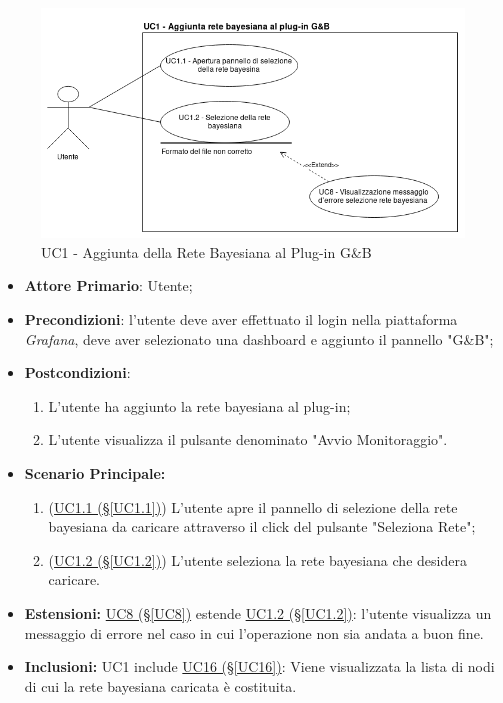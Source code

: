 \begin{figure}[H]
	\begin{center}
		\includegraphics[scale=0.5]{./images/UC1.png}
		 \caption{UC1 - Aggiunta della Rete Bayesiana al Plug-in G\&B}	
	\end{center}
\end{figure}

\begin{itemize}
	\item \textbf{Attore Primario}: Utente;
	\item \textbf{Precondizioni}: l'utente deve aver effettuato il login nella piattaforma \textit{Grafana}, deve aver selezionato una dashboard e aggiunto il pannello "G\&B";
	\item \textbf{Postcondizioni}: 
	\begin{enumerate}
		\item L'utente ha aggiunto la rete bayesiana al plug-in;
		\item L'utente visualizza il pulsante denominato "Avvio Monitoraggio".
	\end{enumerate}
	\item \textbf{Scenario Principale:}
	\begin{enumerate}
		\item (\hyperref[UC1.1]{UC1.1 (§\ref*{UC1.1})}) L'utente apre il pannello di selezione della rete bayesiana da caricare attraverso il click del pulsante "Seleziona Rete";
		\item (\hyperref[UC1.2]{UC1.2 (§\ref*{UC1.2})}) L'utente seleziona la rete bayesiana che desidera caricare.
	\end{enumerate}
	\item \textbf{Estensioni:} \hyperref[UC8]{UC8 (§\ref*{UC8})} estende \hyperref[UC1.2]{UC1.2 (§\ref*{UC1.2})}: l'utente visualizza un messaggio di errore nel caso in cui l'operazione non sia andata a buon fine.
	\item \textbf{Inclusioni:} UC1 include \hyperref[UC16]{UC16 (§\ref*{UC16})}: Viene visualizzata la lista di nodi di cui la rete bayesiana caricata è costituita.
\end{itemize}

